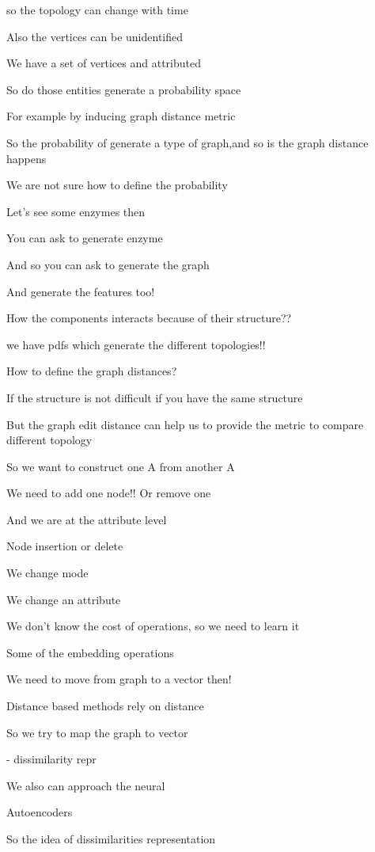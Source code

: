 \documentclass{article}
\begin{document}
so the topology can change with time

Also the vertices can be unidentified 



We have a set of vertices and attributed

So do those entities generate a probability space

For example by inducing graph distance metric

So the probability of generate a type of graph,and so is the graph distance happens

We are not sure how to define the probability 

Let’s see some enzymes then

You can ask to generate enzyme

And so you can ask to generate the graph

And generate the features too!

How the components interacts because of their structure??

we have pdfs which generate the different topologies!!

How to define the graph distances?

If the structure is not difficult if you have the same structure 

But the graph edit distance can help us to provide the metric to compare different topology 


So we want to construct one A from another A

We need to add one node!! 
Or remove one

And we are at the attribute level 

Node insertion  or delete

We change mode 

We change an attribute 

We don’t know the cost of operations, so we need to learn it

Some of the embedding operations 

We need to move from graph to a vector then!


Distance based methods rely on distance

So we try to map the graph to vector

- dissimilarity repr


We also can approach the neural

Autoencoders

So the idea of dissimilarities representation
\end{document}
